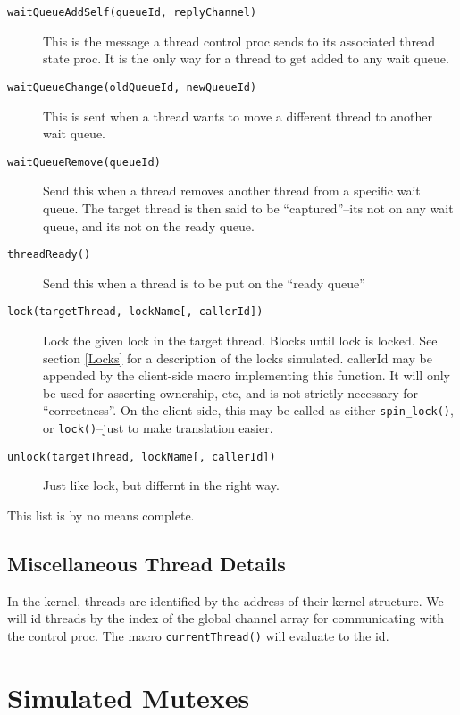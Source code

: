 \begin{description}

\item[{\tt waitQueueAddSelf(queueId, replyChannel)}]  This is the
message a thread control proc sends to its associated thread state
proc.  It is the only way for a thread to get added to any wait queue. 

\item[{\tt waitQueueChange(oldQueueId, newQueueId)}]  This is sent
when a thread wants to move a different thread to another wait queue.

\item[{\tt waitQueueRemove(queueId)}]  Send this when a thread removes
another thread from a specific wait queue.  The target thread is then
said to be ``captured''--its not on any wait queue, and its not on the
ready queue.

\item[{\tt threadReady()}]  Send this when a thread is to be put on
the ``ready queue''

\item[{\tt lock(targetThread, lockName[, callerId])}] 
Lock the given lock in the target thread.
Blocks until lock is locked. 
See section \ref{Locks} for a description of the locks simulated.
callerId may be appended by the client-side macro implementing this function.
It will only be used for asserting ownership, etc, and is not
strictly necessary for ``correctness''.
On the client-side, this may be called as either {\tt spin_lock()}, or
{\tt lock()}--just to make translation easier.

\item[{\tt unlock(targetThread, lockName[, callerId])}]
Just like lock, but differnt in the right way.

\end{description}

This list is by no means complete.

\subsection{Miscellaneous Thread Details}

In the kernel, threads are identified by the address of their
kernel structure.  We will id threads by the index of the
global channel array for communicating with the control proc.
The macro {\tt currentThread()} will evaluate to the id.


\section{Simulated Mutexes}

